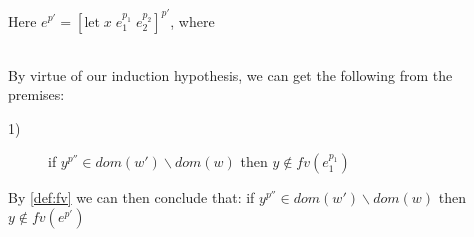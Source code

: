 \item[\runa{Ref}] Here $e^{p'}=[\mbox{let}\;x\;e_1^{p_1}\;e_2^{p_2}]^{p'}$, where
\begin{figure}[H]
	\setlength\tabcolsep{8pt}
	\begin{tabular}{l}
		
	\end{tabular}
\end{figure}
By virtue of our induction hypothesis, we can get the following from the premises:
\begin{description}
	\item[1)] if $y^{p''}\in dom(w')\backslash dom(w)$ then $y\notin fv(e_1^{p_1})$
\end{description}
By \cref{def:fv} we can then conclude that: if $y^{p''}\in dom(w')\backslash dom(w)$ then $y\notin fv(e^{p'})$
